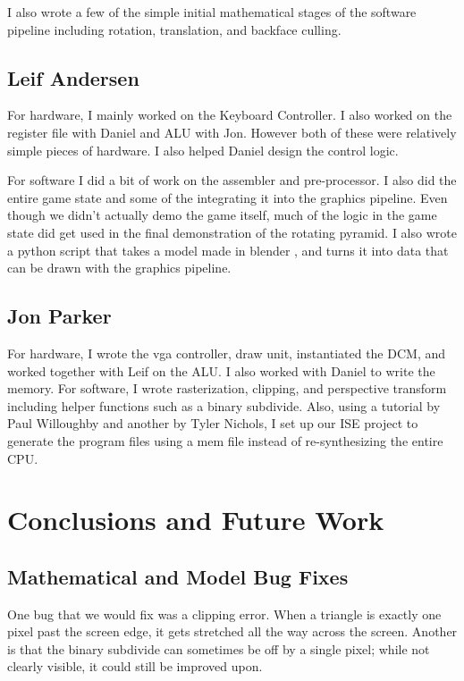 \documentclass[onecolumn]{IEEEtran}
\begin{document}
I also wrote a few of the simple initial mathematical stages of the software pipeline including rotation, translation, and backface culling.

\subsection{Leif Andersen}
For hardware, I mainly worked on the Keyboard Controller.  I also worked on the register file with Daniel and ALU with Jon.  However both of these were relatively simple pieces of hardware.  I also helped Daniel design the control logic.

For software I did a bit of work on the assembler and pre-processor.  I also did the entire game state and some of the integrating it into the graphics pipeline.  Even though we didn't actually demo the game itself, much of the logic in the game state did get used in the final demonstration of the rotating pyramid.  I also wrote a python script that takes a model made in blender \cite{blender}, and turns it into data that can be drawn with the graphics pipeline.

\subsection{Jon Parker}
For hardware, I wrote the vga controller, draw unit, instantiated the DCM, and worked together with Leif on the ALU.  I also worked with Daniel to write the memory.  For software, I wrote rasterization, clipping, and perspective transform including helper functions such as a binary subdivide.  Also, using a tutorial by Paul Willoughby and another by Tyler Nichols, I set up our ISE project to generate the program files using a mem file instead of re-synthesizing the entire CPU.


\section{Conclusions and Future Work}
\subsection{Mathematical and Model Bug Fixes}
One bug that we would fix was a clipping error. When a triangle is exactly one pixel past the screen edge, it gets stretched all the way across the screen.  Another is that the binary subdivide can sometimes be off by a single pixel; while not clearly visible, it could still be improved upon.
\end{document}

